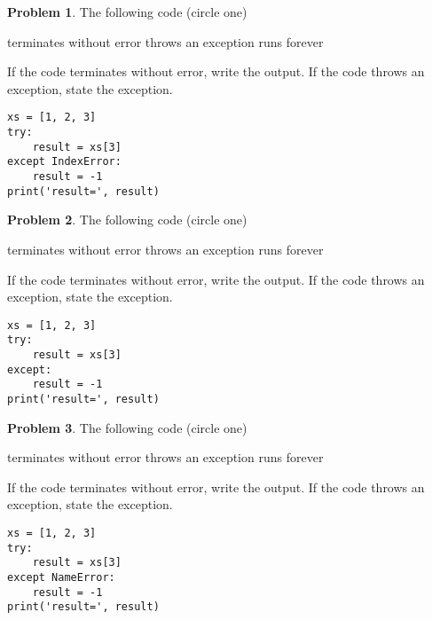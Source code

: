 \documentclass[10pt]{article}
\theoremstyle{definition}
\newtheorem{problem}{Problem}
\begin{document}
\begin{problem}
    The following code (circle one)

    \vspace{0.25in}
    \hspace{0.5in}terminates without error 
    \hspace{1in}throws an exception
    \hspace{1in}runs forever
    \vspace{0.25in}

    \noindent
    If the code terminates without error, write the output.
    If the code throws an exception, state the exception.
\end{problem}
\begin{lstlisting}
xs = [1, 2, 3]
try:
    result = xs[3]
except IndexError:
    result = -1
print('result=', result)
\end{lstlisting}
\vspace{1in}

\begin{problem}
    The following code (circle one)

    \vspace{0.25in}
    \hspace{0.5in}terminates without error 
    \hspace{1in}throws an exception
    \hspace{1in}runs forever
    \vspace{0.25in}

    \noindent
    If the code terminates without error, write the output.
    If the code throws an exception, state the exception.
\end{problem}
\begin{lstlisting}
xs = [1, 2, 3]
try:
    result = xs[3]
except:
    result = -1
print('result=', result)
\end{lstlisting}
\vspace{1in}


\begin{problem}
    The following code (circle one)

    \vspace{0.25in}
    \hspace{0.5in}terminates without error 
    \hspace{1in}throws an exception
    \hspace{1in}runs forever
    \vspace{0.25in}

    \noindent
    If the code terminates without error, write the output.
    If the code throws an exception, state the exception.
\end{problem}
\begin{lstlisting}
xs = [1, 2, 3]
try:
    result = xs[3]
except NameError:
    result = -1
print('result=', result)
\end{lstlisting}
\vspace{1in}
\end{document}
